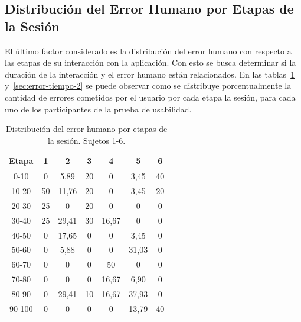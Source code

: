 
\subsection{Distribuci\'on del Error Humano por Etapas de la Sesi\'on}

El \'ultimo factor considerado es la distribuci\'on del error humano con respecto a las etapas 
de su interacci\'on con la aplicaci\'on. Con esto se busca determinar si la duraci\'on de la interacci\'on 
y el error humano est\'an relacionados. 
En las tablas~\ref{sec:error-tiempo-1} y~\ref{sec:error-tiempo-2} se puede observar
como se distribuye porcentualmente la cantidad de errores cometidos por el usuario por cada etapa
la sesi\'on, para cada uno de los participantes de la prueba de usabilidad.

\begin{table}[H]
\centering
\footnotesize
\begin{tabular}{|c|c|c|c|c|c|c|}
\hline
    Etapa & 1 & 2 & 3 & 4 & 5 & 6 \\
\hline
0-10    &  0  &   5,89   &   20  &  0       &   3,45   &   40 \\
10-20   &  50 &   11,76  &   20  &  0       &   3,45   &   20 \\
20-30   &  25 &  0       &   20  &  0       &  0       &   0  \\
30-40   &  25 &   29,41  &   30  &   16,67  &  0       &   0  \\
40-50   &  0  &   17,65  &   0   &  0       &   3,45   &   0  \\
50-60   &  0  &   5,88   &   0   &  0       &   31,03  &   0  \\
60-70   &  0  &  0       &   0   &  50      &  0       &   0  \\
70-80   &  0  &  0       &   0   &   16,67  &   6,90   &   0  \\
80-90   &  0  &  29,41   &   10  &   16,67  &   37,93  &   0  \\
90-100  &  0  &  0       &   0   &  0       &   13,79  &   40 \\
\hline
\end{tabular}
\caption{Distribuci\'on del error humano por etapas de la sesi\'on. Sujetos 1-6.}
\label{sec:error-tiempo-1}
\end{table}

